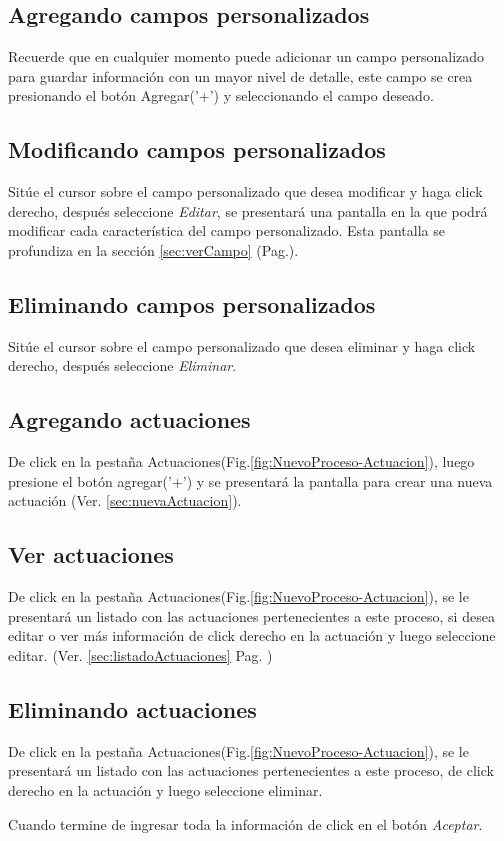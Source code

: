 \subsection{Agregando campos personalizados}
\label{sec:agregarCamposProceso}
Recuerde que en cualquier momento puede adicionar un campo personalizado para guardar informaci\'on con un mayor nivel de detalle, este campo se crea presionando el bot\'on Agregar('+') y seleccionando el campo deseado.

\subsection{Modificando campos personalizados}
\label{sec:modificarCamposProceso}
Sit\'ue el cursor sobre el campo personalizado que desea modificar y haga click derecho, despu\'es seleccione \emph{Editar},
se presentar\'a una pantalla en la que podr\'a modificar cada caracter\'istica
del campo personalizado. Esta pantalla se profundiza en la secci\'on
\ref{sec:verCampo} (Pag.\pageref{sec:verCampo}).

\subsection{Eliminando campos personalizados}
\label{sec:eliminarCamposProceso}
Sit\'ue el cursor sobre el campo personalizado que desea eliminar y haga click derecho, despu\'es seleccione \emph{Eliminar}.

\subsection{Agregando actuaciones}
\label{sec:agregarActuacionesProceso}
De click en la pesta\~na Actuaciones(Fig.\ref{fig:NuevoProceso-Actuacion}), luego presione el bot\'on agregar('+') y se presentar\'a la pantalla para crear una nueva actuaci\'on (Ver.
\ref{sec:nuevaActuacion}).
  


\subsection{Ver actuaciones}
\label{sec:verActuacionesProceso}
De click en la pesta\~na Actuaciones(Fig.\ref{fig:NuevoProceso-Actuacion}), se le
presentar\'a un listado con las actuaciones pertenecientes a este proceso,
si desea editar o ver m\'as informaci\'on de click derecho en la actuaci\'on y luego seleccione editar. (Ver.
\ref{sec:listadoActuaciones} Pag. \pageref{sec:listadoActuaciones})

\subsection{Eliminando actuaciones}
\label{sec:eliminarActuacionesProceso}
De click en la pesta\~na Actuaciones(Fig.\ref{fig:NuevoProceso-Actuacion}), se le
presentar\'a un listado con las actuaciones pertenecientes a este proceso,
de click derecho en la actuaci\'on y luego seleccione eliminar.

Cuando termine de ingresar toda la informaci\'on de click en el bot\'on \emph{Aceptar}.

